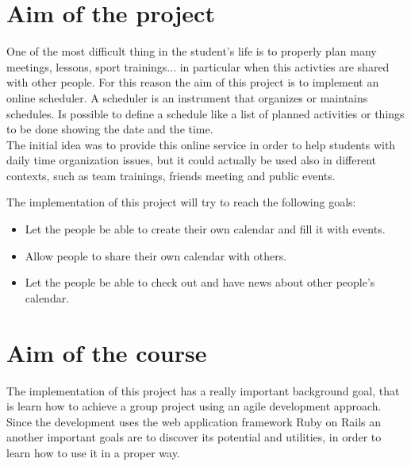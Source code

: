
\label{Introduction}
\section{Aim of the project}
One of the most difficult thing in the student's life is to properly plan many meetings, lessons, sport trainings... in particular when this activties are shared with other people.
For this reason the aim of this project is to implement an online scheduler.
A scheduler is an instrument that organizes or maintains schedules. Is possible to define a schedule like a list of planned activities or things to be done showing the date and the time.\\
The initial idea was to provide this online service in order to help students with daily time organization issues, but it could actually  be used also in different contexts, such as team trainings, friends meeting and public events.

The implementation of this project will try to reach the following goals:
\vspace{-5mm}
\begin{itemize}
 \setlength{\itemsep}{-5pt}
 \item Let the people be able to create their own calendar and fill it with events.
 \item Allow people to share their own calendar with others.
 \item Let the people be able to check out and have news about other people's calendar.
\end{itemize}
\section{Aim of the course}
The implementation of this project has a really important background goal, that is learn how to achieve a group project using an agile development approach.\\
Since the development uses the web application framework Ruby on Rails an another important goals are to discover its potential and utilities, in order to learn how to use it in a proper way.